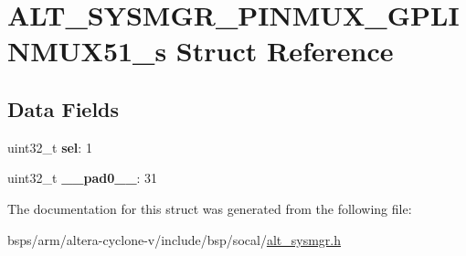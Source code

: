 \hypertarget{structALT__SYSMGR__PINMUX__GPLINMUX51__s}{}\section{A\+L\+T\+\_\+\+S\+Y\+S\+M\+G\+R\+\_\+\+P\+I\+N\+M\+U\+X\+\_\+\+G\+P\+L\+I\+N\+M\+U\+X51\+\_\+s Struct Reference}
\label{structALT__SYSMGR__PINMUX__GPLINMUX51__s}
\subsection*{Data Fields}
\begin{DoxyCompactItemize}
\item 
\mbox{\label{structALT__SYSMGR__PINMUX__GPLINMUX51__s_a9ca86a898e6aefa74bec4061bffd301e}} 
uint32\+\_\+t {\bfseries sel}\+: 1
\item 
\mbox{\label{structALT__SYSMGR__PINMUX__GPLINMUX51__s_affd04e60de1df70287090340962908e7}} 
uint32\+\_\+t {\bfseries \+\_\+\+\_\+pad0\+\_\+\+\_\+}\+: 31
\end{DoxyCompactItemize}


The documentation for this struct was generated from the following file\+:\begin{DoxyCompactItemize}
\item 
bsps/arm/altera-\/cyclone-\/v/include/bsp/socal/\mbox{\hyperlink{alt__sysmgr_8h}{alt\+\_\+sysmgr.\+h}}\end{DoxyCompactItemize}
